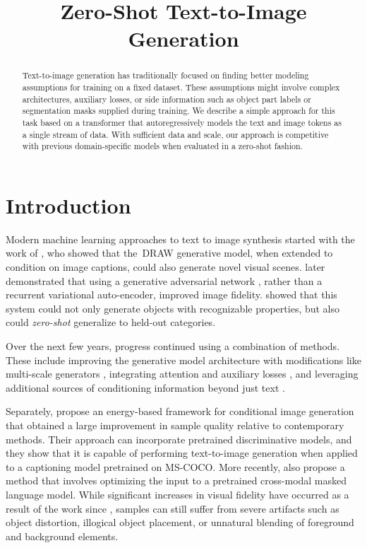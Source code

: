 \title{Zero-Shot Text-to-Image Generation}

\begin{abstract}
Text-to-image generation has traditionally focused on finding better modeling assumptions for training on a fixed dataset. These assumptions might involve complex architectures, auxiliary losses, or side information such as object part labels or segmentation masks supplied during training. We describe a simple approach for this task based on a transformer that autoregressively models the text and image tokens as a single stream of data. With sufficient data and scale, our approach is competitive with previous domain-specific models when evaluated in a zero-shot fashion.
\end{abstract}

\section{Introduction}
\label{intro}

Modern machine learning approaches to text to image synthesis started with the work of \citet{mansimov2015generating}, who showed that the~DRAW \citet{gregor2015draw} generative model, when extended to condition on image captions, could also generate novel visual scenes. \citet{reed2016generative} later demonstrated that using a generative adversarial network \citep{goodfellow2014generative}, rather than a recurrent variational auto-encoder, improved image fidelity. \citet{reed2016generative} showed that this system could not only generate objects with recognizable properties, but also could \textit{zero-shot} generalize to held-out categories.

Over the next few years, progress continued using a combination of methods. These include improving the generative model architecture with modifications like multi-scale generators \citep{zhang2017stackgan,zhang2018stackgan++}, integrating attention and auxiliary losses \citep{xu2018attngan}, and leveraging additional sources of conditioning information beyond just text \citep{reed2016learning,li2019object,koh2021text}.

Separately, \citet{nguyen2017plug} propose an energy-based framework for conditional image generation that obtained a large improvement in sample quality relative to contemporary methods. Their approach can incorporate pretrained discriminative models, and they show that it is capable of performing text-to-image generation when applied to a captioning model pretrained on MS-COCO. More recently, \citet{cho2020x} also propose a method that involves optimizing the input to a pretrained cross-modal masked language model. While significant increases in visual fidelity have occurred as a result of the work since \citet{mansimov2015generating}, samples can still suffer from severe artifacts such as object distortion, illogical object placement, or unnatural blending of foreground and background elements.

